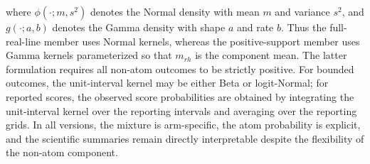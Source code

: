 \documentclass[11pt]{article}
\begin{document}
where $\phi(\cdot; m,s^2)$ denotes the Normal density with mean $m$ and variance $s^2$, and $g(\cdot; a,b)$ denotes the Gamma density with shape $a$ and rate $b$. Thus the full-real-line member uses Normal kernels, whereas the positive-support member uses Gamma kernels parameterized so that $m_{rh}$ is the component mean. The latter formulation requires all non-atom outcomes to be strictly positive. For bounded outcomes, the unit-interval kernel may be either Beta or logit-Normal; for reported scores, the observed score probabilities are obtained by integrating the unit-interval kernel over the reporting intervals and averaging over the reporting grids. In all versions, the mixture is arm-specific, the atom probability is explicit, and the scientific summaries remain directly interpretable despite the flexibility of the non-atom component.
\end{document}
